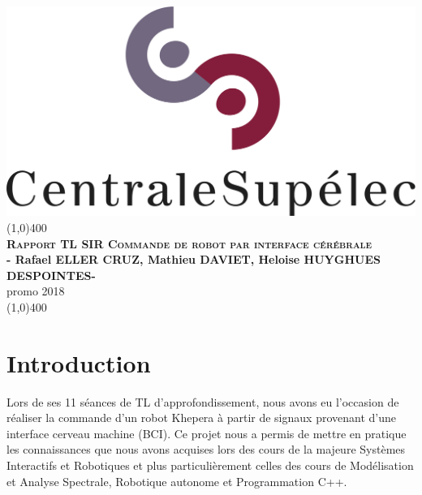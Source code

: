 \documentclass[11pt]{article}
\begin{document}

\begin{titlepage}
\begin{center}
\includegraphics[scale=0.5]{CentraleSupelec.jpeg}\\
\vfill
\line(1,0){400}\\[1mm]
\huge{\textsc{\textbf{Rapport TL SIR Commande de robot par interface cérébrale}}}\\[3mm]
\Large{\textbf{- Rafael ELLER CRUZ, Mathieu DAVIET, Heloise HUYGHUES DESPOINTES-}}\\[1mm]
\Large{promo 2018}\\[1mm]
\line(1,0){400}\\[1mm]

\vfill

\end{center}
\end{titlepage}


\tableofcontents
\thispagestyle{empty}
\cleardoublepage


\setcounter{page}{1}
\section{Introduction}

Lors de ses 11 séances de TL d'approfondissement, nous avons eu l'occasion de réaliser la commande d'un robot Khepera à partir de signaux provenant d'une interface cerveau machine (BCI). Ce projet nous a permis de mettre en pratique les connaissances que nous avons acquises lors des cours de la majeure Systèmes Interactifs et Robotiques et plus particulièrement celles des cours de Modélisation et Analyse Spectrale, Robotique autonome et Programmation C++.\\
\end{document}
